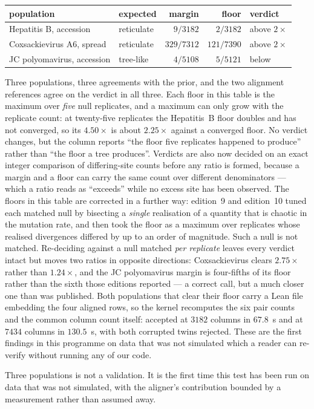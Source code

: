 \begin{numerics}
\begin{center}\footnotesize
\begin{tabular}{@{}llrrl@{}}
\toprule
population & expected & margin & floor & verdict \\
\midrule
Hepatitis B, accession & reticulate & $9/3182$ & $2/3182$ & above $2\times$ \\
Coxsackievirus A6, spread & reticulate & $329/7312$ & $121/7390$ & above $2\times$ \\
JC polyomavirus, accession & tree-like & $4/5108$ & $5/5121$ & below \\
\bottomrule
\end{tabular}
\end{center}

Three populations, three agreements with the prior, and the two alignment
references agree on the verdict in all three. Each floor in this table is the
maximum over \emph{five} null replicates, and a maximum can only grow with the
replicate count: at twenty-five replicates the Hepatitis~B floor doubles and has
not converged, so its $4.50\times$ is about $2.25\times$ against a converged
floor. No verdict changes, but the column reports ``the floor five replicates
happened to produce'' rather than ``the floor a tree produces''. Verdicts are
also now decided on an exact integer comparison of differing-site counts before
any ratio is formed, because a margin and a floor can carry the same count over
different denominators --- which a ratio reads as ``exceeds'' while no excess site
has been observed. The floors in this table are corrected in a further way: edition~9 and edition~10 tuned each matched null by bisecting a
\emph{single} realisation of a quantity that is chaotic in the mutation rate, and
then took the floor as a maximum over replicates whose realised divergences
differed by up to an order of magnitude. Such a null is not matched. Re-deciding
against a null matched \emph{per replicate} leaves every verdict intact but moves
two ratios in opposite directions: Coxsackievirus clears $2.75\times$ rather than
$1.24\times$, and the JC polyomavirus margin is four-fifths of its floor rather
than the sixth those editions reported --- a correct call, but a much closer one
than was published. Both populations that clear their
floor carry a Lean file embedding the four aligned rows, so the kernel
recomputes the six pair counts and the common column count itself: accepted at
$3182$ columns in $67.8$~s and at $7434$ columns in $130.5$~s, with both
corrupted twins rejected. These are the first findings in this programme on data
that was not simulated which a reader can re-verify without running any of our
code.

Three populations is not a validation. It is the first time this test has been
run on data that was not simulated, with the aligner's contribution bounded by a
measurement rather than assumed away.
\end{numerics}

